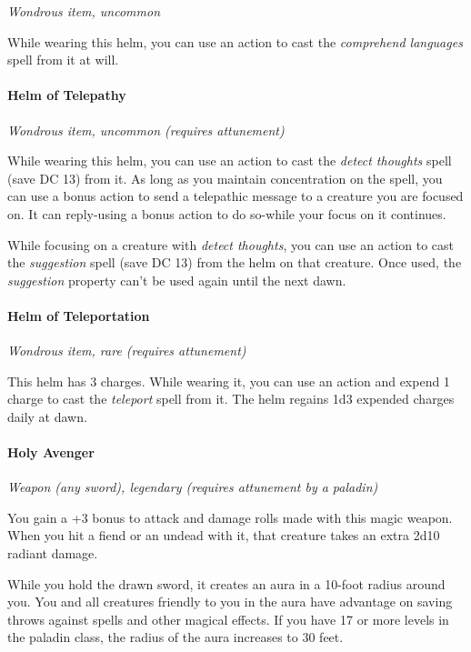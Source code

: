 \documentclass[
]{article}
\begin{document}
\emph{Wondrous item, uncommon}

While wearing this helm, you can use an action to cast the
\emph{comprehend languages} spell from it at will.

\hypertarget{helm-of-telepathy}{%
\paragraph{Helm of Telepathy}\label{helm-of-telepathy}}

\emph{Wondrous item, uncommon (requires attunement)}

While wearing this helm, you can use an action to cast the \emph{detect
thoughts} spell (save DC 13) from it. As long as you maintain
concentration on the spell, you can use a bonus action to send a
telepathic message to a creature you are focused on. It can reply-using
a bonus action to do so-while your focus on it continues.

While focusing on a creature with \emph{detect thoughts}, you can use an
action to cast the \emph{suggestion} spell (save DC 13) from the helm on
that creature. Once used, the \emph{suggestion} property can't be used
again until the next dawn.

\hypertarget{helm-of-teleportation}{%
\paragraph{Helm of Teleportation}\label{helm-of-teleportation}}

\emph{Wondrous item, rare (requires attunement)}

This helm has 3 charges. While wearing it, you can use an action and
expend 1 charge to cast the \emph{teleport} spell from it. The helm
regains 1d3 expended charges daily at dawn.

\hypertarget{holy-avenger}{%
\paragraph{Holy Avenger}\label{holy-avenger}}

\emph{Weapon (any sword), legendary (requires attunement by a paladin)}

You gain a +3 bonus to attack and damage rolls made with this magic
weapon. When you hit a fiend or an undead with it, that creature takes
an extra 2d10 radiant damage.

While you hold the drawn sword, it creates an aura in a 10-foot radius
around you. You and all creatures friendly to you in the aura have
advantage on saving throws against spells and other magical effects. If
you have 17 or more levels in the paladin class, the radius of the aura
increases to 30 feet.
\end{document}
